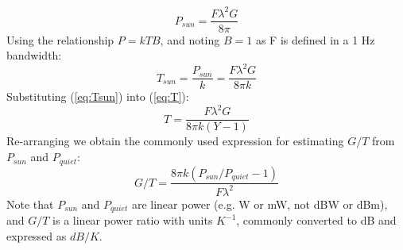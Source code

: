 \documentclass{article}
\begin{document}
\begin{equation}
P_{sun} = \frac{F\lambda^2G}{8\pi}
\end{equation}
Using the relationship $P=kTB$, and noting $B=1$ as F is defined in a 1 Hz bandwidth:
\begin{equation} \label{eq:Tsun}
T_{sun} = \frac{P_{sun}}{k} = \frac{F\lambda^2G}{8\pi k}
\end{equation}
Substituting (\ref{eq:Tsun}) into (\ref{eq:T}):
\begin{equation}
T = \frac{F\lambda^2G}{8\pi k(Y-1)}
\end{equation}
Re-arranging we obtain the commonly used expression for estimating $G/T$ from $P_{sun}$ and $P_{quiet}$:
\begin{equation}
G/T = \frac{8\pi k(P_{sun}/P_{quiet}-1)}{F\lambda^2}
\end{equation}
Note that $P_{sun}$ and $P_{quiet}$ are linear power (e.g. W or mW, not dBW or dBm), and $G/T$ is a linear power ratio with units $K^{-1}$, commonly converted to dB and expressed as $dB/K$.


\end{document}
